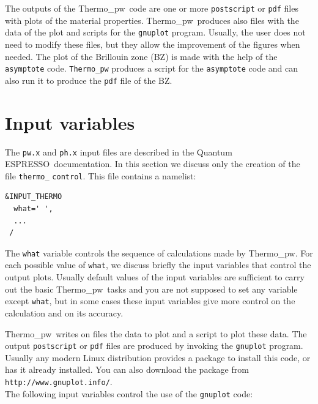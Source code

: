 \documentclass[12pt,a4paper,twoside]{report}
\def\qe{{\sc Quantum ESPRESSO}}
\def\thermo{{\sc Thermo}\_{\sc pw}}
\begin{document}
The outputs of the \thermo\ code are one or more \texttt{postscript} or
\texttt{pdf} files 
with plots of the material properties. \thermo\ produces also files with 
the data of 
the plot and scripts for the \texttt{gnuplot} program. 
Usually, the user does not need to modify these files, but they allow 
the improvement of the figures when needed.
The plot of the Brillouin zone (BZ) is made with the help of the 
\texttt{asymptote} code. \texttt{Thermo\_pw} produces a script 
for the \texttt{asymptote} code and can also run it to produce the \texttt{pdf}
file of the BZ.  

\newpage

{\color{dark-blue}\chapter{Input variables}}
\color{black}

The \texttt{pw.x} and \texttt{ph.x} input files are described in the \qe\ documentation.
In this section we discuss only the creation of the file
\texttt{thermo\_} \texttt{control}. This file contains a namelist:  

\begin{verbatim}
&INPUT_THERMO
  what=' ',
  ...
 /
\end{verbatim}

The \texttt{what} variable controls the sequence of calculations made
by \thermo. For each possible value of \texttt{what}, we discuss briefly the
input variables that control the output plots. Usually
default values of the input variables are sufficient to carry out  
the basic \thermo\ tasks and you are not supposed to set any variable except
\texttt{what}, but in some cases these input variables give more control
on the calculation and on its accuracy.

\thermo\ writes on files the data to plot and a script to plot
these data. The output \texttt{postscript} or \texttt{pdf} files are produced 
by invoking the 
\texttt{gnuplot} program. Usually any modern Linux 
distribution provides a package to install this code, or has it already 
installed. You can also download the package from 
\texttt{http://www.gnuplot.info/}. \\
The following input variables control the use of the \texttt{gnuplot} code:
\end{document}
